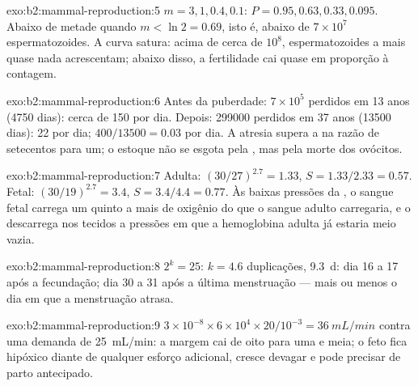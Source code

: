 \begin{solution}{exo:b2:mammal-reproduction:5}
$m = 3, 1, 0.4, 0.1$: $P = 0.95, 0.63, 0.33, 0.095$. Abaixo de metade
quando $m < \ln 2 = 0.69$, isto é, abaixo de $7\times 10^{7}$
espermatozoides. A curva satura: acima de cerca de $10^{8}$,
espermatozoides a mais quase nada acrescentam; abaixo disso, a
fertilidade cai quase em proporção à contagem.
\end{solution}

\begin{solution}{exo:b2:mammal-reproduction:6}
Antes da puberdade: $7\times 10^{5}$ perdidos em 13 anos (\num{4750}
dias): cerca de 150 por dia. Depois: \num{299000} perdidos em 37 anos
(\num{13500} dias): 22 por dia;  $400/\num{13500} = 0.03$ por
dia. A atresia supera a  na razão de setecentos para um; o
estoque não se esgota pela , mas pela morte dos ovócitos.
\end{solution}

\begin{solution}{exo:b2:mammal-reproduction:7}
Adulta: $(30/27)^{2.7} = 1.33$, $S = 1.33/2.33 = 0.57$. Fetal:
$(30/19)^{2.7} = 3.4$, $S = 3.4/4.4 = 0.77$. Às baixas pressões da
, o sangue fetal carrega um quinto a mais de oxigênio do que o
sangue adulto carregaria, e o descarrega nos tecidos a pressões em que
a hemoglobina adulta já estaria meio vazia.
\end{solution}

\begin{solution}{exo:b2:mammal-reproduction:8}
$2^{k} = 25$: $k = 4.6$ duplicações, \qty{9.3}{d}: dia 16 a 17 após a
fecundação; dia 30 a 31 após a última menstruação --- mais ou menos o
dia em que a menstruação atrasa.
\end{solution}

\begin{solution}{exo:b2:mammal-reproduction:9}
$3\times 10^{-8}\times 6\times 10^{4}\times 20/10^{-3} =
\qty{36}{mL/min}$ contra uma demanda de \qty{25}{mL/min}: a margem cai
de oito para uma e meia; o feto fica hipóxico diante de qualquer esforço
adicional, cresce devagar e pode precisar de parto antecipado.
\end{solution}

